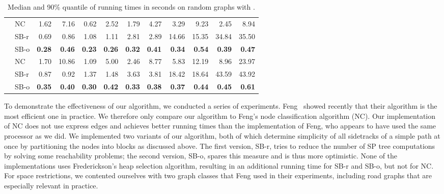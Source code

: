 \documentclass[runningheads,a4paper]{llncs}
\begin{document}
\begin{table}[tb]
\begin{tabularx}{1\textwidth}{p{0.8cm}p{0.8cm}|RR|RR|RR|RR|RR}
\hline
\centering{} & \centering NC & 1.62 & 7.16 & 0.62 & 2.52 & 1.79 & 4.27 & 3.29 & 9.23 & 2.45 & 8.94 \\
& \centering SB-r  & 0.69 & 0.86 & 1.08 & 1.11 & 2.81 & 2.89 & 14.66 & 15.35 & 34.84 & 35.50 \\
& \centering SB-o  & \textbf{0.28} & \textbf{0.46} & \textbf{0.23} & \textbf{0.26} & \textbf{0.32} & \textbf{0.41} & \textbf{0.34} & \textbf{0.54} & \textbf{0.39} & \textbf{0.47} \\
\hline
\centering{} & \centering NC & 1.70 & 10.86 & 1.09 & 5.00 & 2.46 & 8.77 & 5.83 & 12.19 & 8.96 & 23.97 \\
& \centering SB-r  & 0.87 & 0.92 & 1.37 & 1.48 & 3.63 & 3.81 & 18.42 & 18.64 & 43.59 & 43.92 \\
& \centering SB-o  & \textbf{0.35} & \textbf{0.40} & \textbf{0.30} & \textbf{0.42} & \textbf{0.33} & \textbf{0.38} & \textbf{0.37} & \textbf{0.44} & \textbf{0.45} & \textbf{0.61} \\
\end{tabularx}
\vspace{2mm}
\caption{Median and 90\% quantile  of running times in seconds on random graphs with .}
\label{table:random}
\end{table}

To demonstrate the effectiveness of our algorithm, we conducted a series of experiments.
Feng~\cite{DBLP:journals/networks/Feng14} showed recently that their algorithm is the most efficient one in practice.
We therefore only compare our algorithm to Feng's node classification algorithm (NC).
Our implementation of NC does not use express edges and achieves better running times than the implementation of Feng, who appears to have used the same processor as we did.
We implemented two variants of our algorithm, both of which determine simplicity of all sidetracks of a simple path at once by partitioning the nodes into blocks as discussed above.
The first version, SB-r, tries to reduce the number of SP tree computations by solving some reachability problems; the second version, SB-o, spares this measure and is thus more optimistic.
None of the implementations uses Frederickson's heap selection algorithm, resulting in an additional running time  for SB-r and SB-o, but not for NC.
For space restrictions, we contented ourselves with two graph classes that Feng used in their experiments, including road graphs that are especially relevant in practice.
\end{document}
